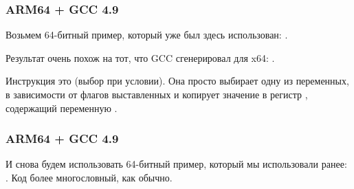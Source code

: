 \subsubsection{ARM64 + \Optimizing GCC 4.9}

Возьмем 64-битный пример, который уже был здесь использован: .


Результат очень похож на тот, что GCC сгенерировал для x64: .

Инструкция \CSEL это  (выбор при условии). 
Она просто выбирает одну из переменных, в зависимости от флагов выставленных \TST и копирует значение в регистр , содержащий переменную .

\subsubsection{ARM64 + \NonOptimizing GCC 4.9}

И снова будем использовать 64-битный пример, который мы использовали ранее: .
Код более многословный, как обычно.



